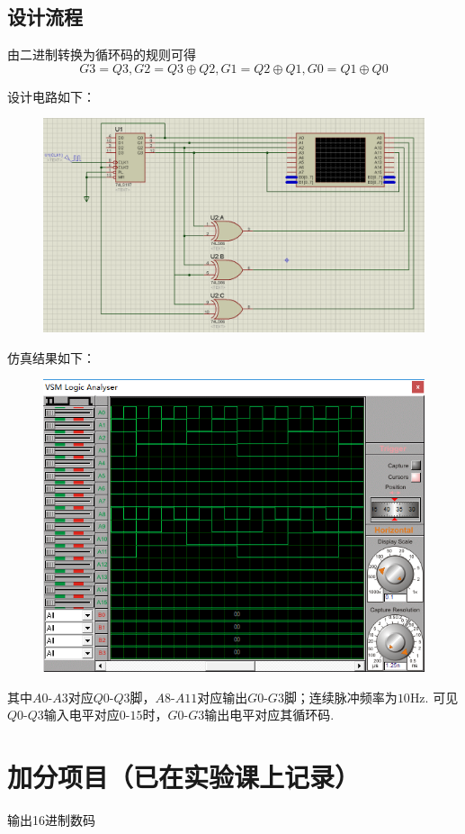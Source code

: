 \documentclass[11pt,UTF8]{ctexart}
\begin{document}
\subsection{设计流程}
由二进制转换为循环码的规则可得
\[G3=Q3,G2=Q3\oplus Q2,G1=Q2\oplus Q1,G0=Q1\oplus Q0\]
\par 设计电路如下：
\begin{figure}[H]
\centering
\includegraphics[width=\linewidth]{fig/lab3main.PNG}
\label{Fig:main}
\end{figure}
\par 仿真结果如下：
\begin{figure}[H]
\centering
\includegraphics[width=0.8\linewidth]{fig/VSM1.PNG}
\label{Fig:main}
\end{figure}
\par 其中$A0$-$A3$对应$Q0$-$Q3$脚，$A8$-$A11$对应输出$G0$-$G3$脚；连续脉冲频率为$10$Hz. 可见$Q0$-$Q3$输入电平对应$0$-$15$时，$G0$-$G3$输出电平对应其循环码.


\section{加分项目（已在实验课上记录）}
输出16进制数码
\end{document}
